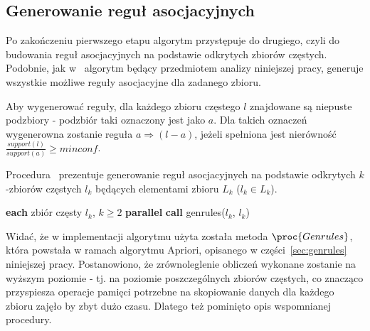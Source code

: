 \subsection{Generowanie reguł asocjacyjnych}
Po zakończeniu pierwszego etapu algorytm przystępuje do drugiego, czyli do budowania reguł asocjacyjnych na podstawie odkrytych zbiorów częstych. Podobnie, jak w~\cite{Apriori:Main} algorytm będący przedmiotem analizy niniejszej pracy, generuje wszystkie możliwe reguły asocjacyjne dla zadanego zbioru.

Aby wygenerować reguły, dla każdego zbioru częstego $l$ znajdowane są niepuste podzbiory - podzbiór taki oznaczony jest jako $a$. Dla takich oznaczeń wygenerowna zostanie reguła $a \Rightarrow (l-a)$, jeżeli spełniona jest nierówność $\frac{support(l)}{support(a)} \geq minconf$.

Procedura~ prezentuje generowanie reguł asocjacyjnych na podstawie odkrytych $k$-zbiorów częstych $l_k$ będących elementami zbioru $L_k$ ($l_k \in L_k$).

\begin{codebox}
		\li \For \textbf{each} zbiór częsty $l_k$, $k \geq 2$ \textbf{parallel}
		\li \Do
			\textbf{call} genrules($l_k$, $l_k$)
			\End
		\End
\end{codebox}

Widać, że w implementacji algorytmu użyta została metoda $\proc{Genrules}$, która powstała w ramach algorytmu Apriori, opisanego w części~\ref{sec:genrules} niniejszej pracy. Postanowiono, że zrównoleglenie obliczeń wykonane zostanie na wyższym poziomie - tj. na poziomie poszczególnych zbiorów częstych, co znacząco przyspiesza operacje pamięci potrzebne na skopiowanie danych dla każdego zbioru zajęło by zbyt dużo czasu. Dlatego też pominięto opis wspomnianej procedury.